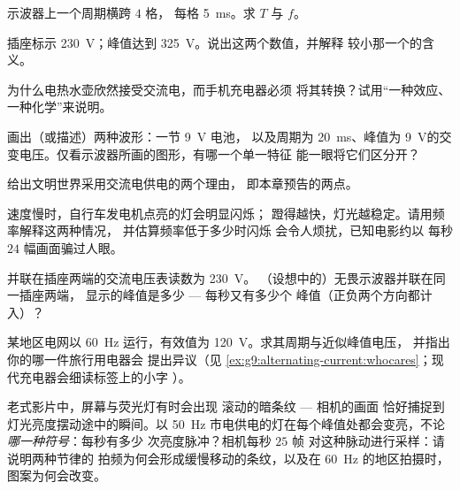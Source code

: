 \begin{exercise}[$\star$]\label{exo:g9:alternating-current:4}
示波器上一个周期横跨 $4$ 格，
每格 \qty{5}{ms}。求 $T$ 与 $f$。
\end{exercise}

\begin{exercise}[$\star$]\label{exo:g9:alternating-current:5}
插座标示 \qty{230}{V}；峰值达到
\qty{325}{V}。说出这两个数值，并解释
较小那一个的含义。
\end{exercise}

\begin{exercise}[$\star$]\label{exo:g9:alternating-current:6}
为什么电热水壶欣然接受交流电，而手机充电器必须
将其转换？试用“一种效应、一种化学”来说明。
\end{exercise}

\begin{exercise}[$\star$]\label{exo:g9:alternating-current:7}
画出（或描述）两种波形：一节 \qty{9}{V} 电池，
以及周期为 \qty{20}{ms}、峰值为
\qty{9}{V}的交变电压。仅看示波器所画的图形，有哪一个单一特征
能一眼将它们区分开？
\end{exercise}

\begin{exercise}[$\star$]\label{exo:g9:alternating-current:8}
给出文明世界采用交流电供电的两个理由，
即本章预告的两点。
\end{exercise}

\begin{exercise}[$\star\star$]\label{exo:g9:alternating-current:9}
速度慢时，自行车发电机点亮的灯会明显闪烁；
蹬得越快，灯光越稳定。请用频率解释这两种情况，
并估算频率低于多少时闪烁
会令人烦扰，已知电影约以
每秒 $24$ 幅画面骗过人眼。
\end{exercise}

\begin{exercise}[$\star\star$]\label{exo:g9:alternating-current:10}
并联在插座两端的交流电压表读数为 \qty{230}{V}。
（设想中的）无畏示波器并联在同一插座两端，
显示的峰值是多少 --- 每秒又有多少个
峰值（正负两个方向都计入）？
\end{exercise}

\begin{exercise}[$\star\star$]\label{exo:g9:alternating-current:11}
某地区电网以 \qty{60}{Hz} 运行，有效值为
\qty{120}{V}。求其周期与近似峰值电压，
并指出你的哪一件旅行用电器会
提出异议（见
\cref{ex:g9:alternating-current:whocares}；现代充电器会细读标签上的小字
）。
\end{exercise}

\begin{exercise}[$\star\star\star$]\label{exo:g9:alternating-current:12}
老式影片中，屏幕与荧光灯有时会出现
滚动的暗条纹 --- 相机的画面
恰好捕捉到灯光亮度摆动途中的瞬间。以 \qty{50}{Hz}
市电供电的灯在每个峰值处都会变亮，不论\emph{哪一种符号}：每秒有多少
次亮度脉冲？相机每秒 $25$ 帧
对这种脉动进行采样：请说明两种节律的
拍频为何会形成缓慢移动的条纹，以及在
\qty{60}{Hz} 的地区拍摄时，图案为何会改变。
\end{exercise}

